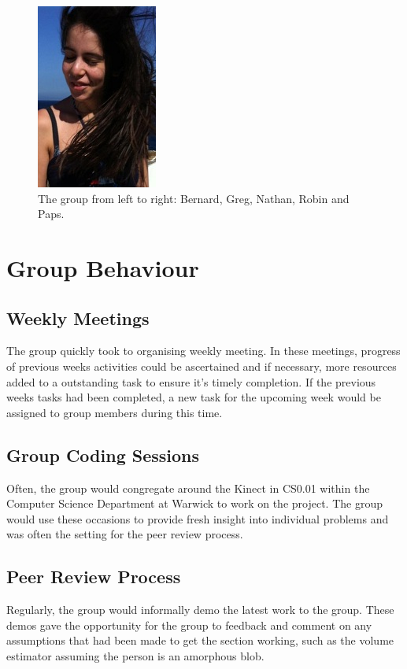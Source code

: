 \begin{figure}[h]
\begin{center}
\includegraphics[scale=0.5]{./pm/stef} 
\end{center}
\caption{The group from left to right: Bernard, Greg, Nathan, Robin and Paps.}
\label{fig:the group}
\end{figure}

\section{Group Behaviour}

\subsection{Weekly Meetings}
The group quickly took to organising weekly meeting. 
In these meetings, progress of previous weeks activities could be ascertained and if necessary, more resources added to a outstanding task to ensure it's timely completion. 
If the previous weeks tasks had been completed, a new task for the upcoming week would be assigned to group members during this time.\\

\subsection{Group Coding Sessions}
Often, the group would congregate around the Kinect in CS0.01 within the Computer Science Department at Warwick to work on the project. The group would use these occasions to provide fresh insight into individual problems and was often the setting for the peer review process.\\

\subsection{Peer Review Process}
\label{pm:peer review process}
Regularly, the group would informally demo the latest work to the group.
These demos gave the opportunity for the group to feedback and comment on any assumptions that had been made to get the section working, such as the volume estimator assuming the person is an amorphous blob.\\

